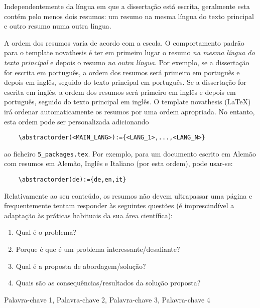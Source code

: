 
%

Independentemente da língua em que a dissertação está escrita, geralmente esta contém pelo menos dois resumos: um resumo na mesma língua do texto principal e outro resumo numa outra língua.

A ordem dos resumos varia de acordo com a escola. O comportamento padrão para o template \gls{novathesis} é ter em primeiro lugar o resumo \emph{na mesma língua do texto principal} e depois o resumo \emph{na outra língua}. Por exemplo, se a dissertação for escrita em português, a ordem dos resumos será primeiro em português e depois em inglês, seguido do texto principal em português. Se a dissertação for escrita em inglês, a ordem dos resumos será primeiro em inglês e depois em português, seguido do texto principal em inglês.
%
O template \gls{novathesis} (\LaTeX) irá ordenar automaticamente os resumos por uma ordem apropriada. No entanto, esta ordem pode ser personalizada adicionando
\begin{verbatim}
    \abstractorder(<MAIN_LANG>):={<LANG_1>,...,<LANG_N>}
\end{verbatim}
\noindent ao ficheiro \verb!5_packages.tex!.  Por exemplo, para um documento escrito em Alemão com resumos em Alemão, Inglês e Italiano (por esta ordem), pode usar-se:
\begin{verbatim}
    \abstractorder(de):={de,en,it}
\end{verbatim}

Relativamente ao seu conteúdo, os resumos não devem ultrapassar uma página e frequentemente tentam responder às seguintes questões (é imprescindível a adaptação às práticas habituais da sua área científica):

\begin{enumerate}
  \item Qual é o problema?
  \item Porque é que é um problema interessante/desafiante?
  \item Qual é a proposta de abordagem/solução?
  \item Quais são as consequências/resultados da solução proposta?
\end{enumerate}

%
%

\begin{keywords}
Palavra-chave 1, Palavra-chave 2, Palavra-chave 3, Palavra-chave 4
\end{keywords}
